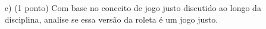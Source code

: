 \documentclass[12pt]{article}
\begin{document}
\begin{enumerate}[label=\alph*), resume]
    \item[c)] (1 ponto) Com base no conceito de jogo justo discutido ao longo da disciplina, analise se essa versão da roleta é um jogo justo.
\end{enumerate}





\end{document}
